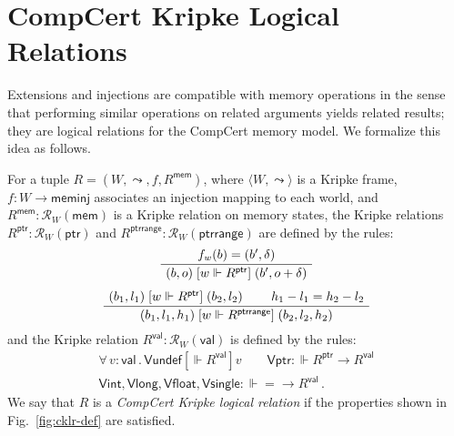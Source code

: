 \documentclass[sigplan,10pt,review,anonymous]{acmart}
\newcommand{\kw}[1]{\ensuremath{ \mathsf{#1} }}
\newcommand{\ifr}[1]{\mathrel{[{#1}]}}
\begin{document}


\section{CompCert Kripke Logical Relations} \label{sec:cklr} %

Extensions and injections
are compatible with memory operations
in the sense that
performing similar operations on related arguments
yields related results;
they are logical relations for the CompCert memory model.
We formalize this idea as follows.

\begin{definition} \label{def:cklr} %
For a tuple $R = (W, \leadsto, f, R^\kw{mem})$,
where
$\langle W, \leadsto \rangle$ is a Kripke frame,
$f : W \rightarrow \kw{meminj}$
associates an injection mapping to each world, and
$R^\kw{mem} : \mathcal{R}_{W}(\kw{mem})$
is a Kripke relation on memory states,
the Kripke relations
$R^\kw{ptr} : \mathcal{R}_W(\kw{ptr})$ and
$R^\kw{ptrrange} : \mathcal{R}_W(\kw{ptrrange})$
are defined by the rules:
\begin{gather*}
  \AxiomC{$f_w(b) = (b', \delta)$}
  \UnaryInfC{$(b, o) \ifr{w \Vdash R^\kw{ptr}} (b', o + \delta)$}
  \DisplayProof
  \\[1ex]
  \AxiomC{$(b_1, l_1) \ifr{w \Vdash R^\kw{ptr}} (b_2, l_2)$}
  \AxiomC{$h_1 - l_1 = h_2 - l_2$}
  \BinaryInfC{$(b_1, l_1, h_1) \ifr{w \Vdash R^\kw{ptrrange}} (b_2, l_2, h_2)$}
  \DisplayProof
\end{gather*}
and the Kripke relation
$R^\kw{val} : \mathcal{R}_W(\kw{val})$
is defined by the rules:
\begin{gather*}
  \forall \, v : \kw{val} \,.\,
    \kw{Vundef} \ifr{\Vdash R^\kw{val}} v \qquad
  \kw{Vptr} : {\Vdash R^\kw{ptr} \rightarrow R^\kw{val}} \\
  \kw{Vint}, \kw{Vlong}, \kw{Vfloat}, \kw{Vsingle} :
    {\Vdash {=} \rightarrow R^\kw{val}} \,.
\end{gather*}
We say that $R$ is a \emph{CompCert Kripke logical relation}
if the properties shown in Fig.~\ref{fig:cklr-def} are satisfied.
\end{definition}
\end{document}
